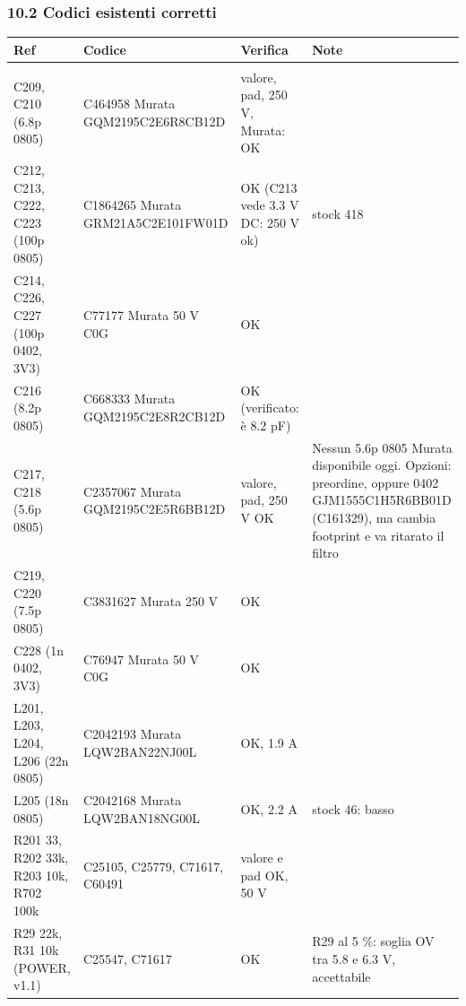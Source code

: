 \subsubsection[10.2 Codici esistenti corretti]{10.2 Codici esistenti corretti}

{\footnotesize{}\setlength{\tabcolsep}{4pt}\renewcommand{\arraystretch}{1.1}
\begin{xltabular}{\linewidth}{>{\hsize\raggedright\arraybackslash}X>{\hsize\raggedright\arraybackslash}X>{\hsize\raggedright\arraybackslash}X>{\hsize\raggedright\arraybackslash}X}
\toprule
\textbf{Ref} & \textbf{Codice} & \textbf{Verifica} & \textbf{Note} \\
\midrule
\endhead
\midrule[0.15pt]\\\bottomrule\endfoot
\bottomrule\endlastfoot
C209, C210 (6.8p 0805) & C464958 Murata GQM2195C2E6R8CB12D & valore, pad, 250 V, Murata: OK &  \\\midrule[0.15pt]
C212, C213, C222, C223 (100p 0805) & C1864265 Murata GRM21A5C2E101FW01D & OK (C213 vede 3.3 V DC: 250 V ok) & stock 418 \\\midrule[0.15pt]
C214, C226, C227 (100p 0402, 3V3) & C77177 Murata 50 V C0G & OK &  \\\midrule[0.15pt]
C216 (8.2p 0805) & C668333 Murata GQM2195C2E8R2CB12D & OK (verificato: è 8.2 pF) &  \\\midrule[0.15pt]
C217, C218 (5.6p 0805) & C2357067 Murata GQM2195C2E5R6BB12D & valore, pad, 250 V OK &  Nessun 5.6p 0805 Murata disponibile oggi. Opzioni: preordine, oppure 0402 GJM1555C1H5R6BB01D (C161329), ma cambia footprint e va ritarato il filtro \\\midrule[0.15pt]
C219, C220 (7.5p 0805) & C3831627 Murata 250 V & OK &  \\\midrule[0.15pt]
C228 (1n 0402, 3V3) & C76947 Murata 50 V C0G & OK &  \\\midrule[0.15pt]
L201, L203, L204, L206 (22n 0805) & C2042193 Murata LQW2BAN22NJ00L & OK, 1.9 A &  \\\midrule[0.15pt]
L205 (18n 0805) & C2042168 Murata LQW2BAN18NG00L & OK, 2.2 A & stock 46: basso \\\midrule[0.15pt]
R201 33, R202 33k, R203 10k, R702 100k & C25105, C25779, C71617, C60491 & valore e pad OK, 50 V &  \\\midrule[0.15pt]
R29 22k, R31 10k (POWER, v1.1) & C25547, C71617 & OK & R29 al 5 \%: soglia OV tra 5.8 e 6.3 V, accettabile \\\midrule[0.15pt]

\end{xltabular}}

